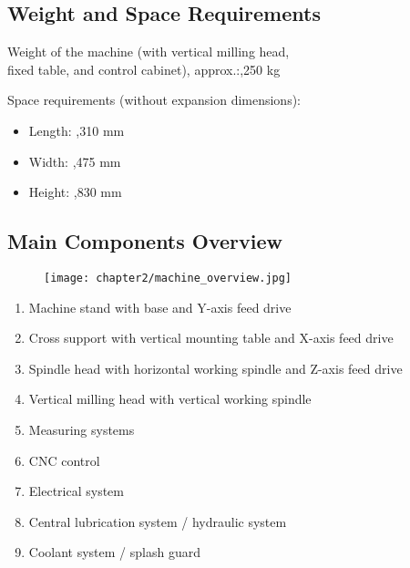 
\subsection{Weight and Space Requirements}
Weight of the machine (with vertical milling head, \\
fixed table, and control cabinet), approx.:,250 kg

Space requirements (without expansion dimensions):
\begin{itemize}
    \item Length: ,310 mm
    \item Width: ,475 mm
    \item Height: ,830 mm
\end{itemize}


\subsection*{Main Components Overview} %

\begin{figure}[h]
    \centering
    \texttt{[image: chapter2/machine\_overview.jpg]}
    \caption{}
    \label{fig:machine_overview}
\end{figure}

\vspace{3cm}

\begin{enumerate}[itemsep=1pt,parsep=0pt]
    \item Machine stand with base and Y-axis feed drive
    \item Cross support with vertical mounting table and X-axis feed drive
    \item Spindle head with horizontal working spindle and Z-axis feed drive
    \item Vertical milling head with vertical working spindle
    \item Measuring systems
    \item CNC control
    \item Electrical system
    \item Central lubrication system / hydraulic system
    \item Coolant system / splash guard
\end{enumerate}

